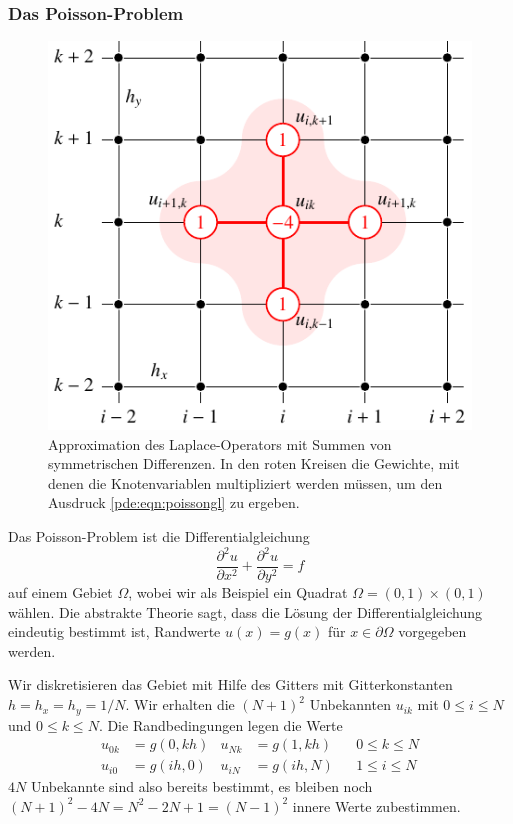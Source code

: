 \subsubsection{Das Poisson-Problem}
\begin{figure}
\centering
\includegraphics{chapters/70-pde/images/laplace.pdf}
\caption{Approximation des Laplace-Operators mit Summen von symmetrischen
Differenzen.
In den roten Kreisen die Gewichte, mit denen die Knotenvariablen 
multipliziert werden müssen, um den Ausdruck
\eqref{pde:eqn:poissongl} zu ergeben.
\label{buch:pde:laplace}}
\end{figure}
Das Poisson-Problem ist die Differentialgleichung
\[
\frac{\partial^2 u}{\partial x^2}
+
\frac{\partial^2 u}{\partial y^2}
=
f
\]
auf einem Gebiet $\Omega$, wobei wir als Beispiel ein Quadrat
$\Omega = (0,1) \times (0,1)$ wählen.
Die abstrakte Theorie sagt, dass die Lösung der Differentialgleichung
eindeutig bestimmt ist, Randwerte $u(x)=g(x)$ für $x\in\partial\Omega$
vorgegeben werden.

Wir diskretisieren das Gebiet mit Hilfe des Gitters mit Gitterkonstanten
$h=h_x=h_y=1/N$.
Wir erhalten die $(N+1)^2$ Unbekannten $u_{ik}$ mit $0\le i\le N$ und 
$0\le k\le N$.
Die Randbedingungen legen die Werte
\begin{align*}
u_{0k}&= g(0, kh)
&
u_{Nk}&= g(1, kh)
&&0\le k\le N
\\
u_{i0}&=g(ih,0)
&
u_{iN}&=g(ih,N)
&&
1\le i\le N
\end{align*}
$4N$ Unbekannte sind also bereits bestimmt, es bleiben noch
$(N+1)^2-4N = N^2-2N+1=(N-1)^2$ innere Werte zubestimmen.

